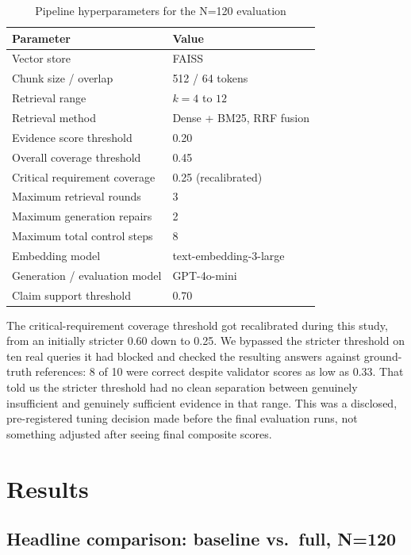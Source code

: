 \documentclass[conference]{IEEEtran}
\begin{document}
\begin{table}[t]
\centering
\caption{Pipeline hyperparameters for the N=120 evaluation}
\label{tab:params}
\begin{tabular}{ll}
\toprule
Parameter & Value \\
\midrule
Vector store & FAISS \\
Chunk size / overlap & 512 / 64 tokens \\
Retrieval range & $k = 4$ to $12$ \\
Retrieval method & Dense + BM25, RRF fusion \\
Evidence score threshold & 0.20 \\
Overall coverage threshold & 0.45 \\
Critical requirement coverage & 0.25 (recalibrated) \\
Maximum retrieval rounds & 3 \\
Maximum generation repairs & 2 \\
Maximum total control steps & 8 \\
Embedding model & text-embedding-3-large \\
Generation / evaluation model & GPT-4o-mini \\
Claim support threshold & 0.70 \\
\bottomrule
\end{tabular}
\end{table}

The critical-requirement coverage threshold got recalibrated during this study, from an
initially stricter 0.60 down to 0.25. We bypassed the stricter threshold on ten real
queries it had blocked and checked the resulting answers against ground-truth
references: 8 of 10 were correct despite validator scores as low as 0.33. That told us
the stricter threshold had no clean separation between genuinely insufficient and
genuinely sufficient evidence in that range. This was a disclosed, pre-registered
tuning decision made before the final evaluation runs, not something adjusted after
seeing final composite scores.

\section{Results}
\label{sec:results}

\subsection{Headline comparison: baseline vs.\ full, N=120}
\end{document}
